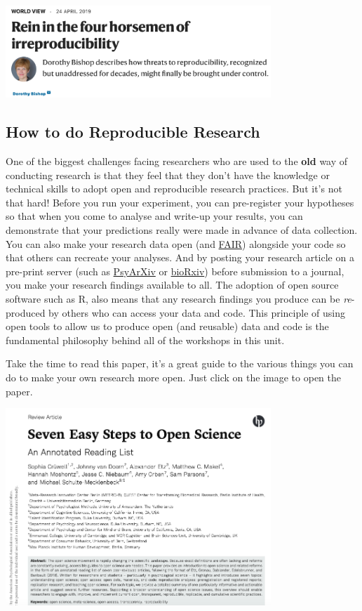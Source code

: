 \documentclass[
]{book}
\begin{document}
~~

\href{https://www.nature.com/articles/d41586-019-01307-2}{\includegraphics[width=0.75\textwidth,height=\textheight]{images/bishop.png}}

\hypertarget{how-to-do-reproducible-research}{%
\subsection{How to do Reproducible Research}\label{how-to-do-reproducible-research}}

One of the biggest challenges facing researchers who are used to the \textbf{old} way of conducting research is that they feel that they don't have the knowledge or technical skills to adopt open and reproducible research practices. But it's not that hard! Before you run your experiment, you can pre-register your hypotheses so that when you come to analyse and write-up your results, you can demonstrate that your predictions really were made in advance of data collection. You can also make your research data open (and \href{https://www.nature.com/articles/sdata201618}{FAIR}) alongside your code so that others can recreate your analyses. And by posting your research article on a pre-print server (such as \href{https://psyarxiv.com}{PsyArXiv} or \href{https://www.biorxiv.org}{bioRxiv}) before submission to a journal, you make your research findings available to all. The adoption of open source software such as R, also means that any research findings you produce can be \emph{re}-produced by others who can access your data and code. This principle of using open tools to allow us to produce open (and reusable) data and code is the fundamental philosophy behind all of the workshops in this unit.

Take the time to read this paper, it's a great guide to the various things you can do to make your own research more open. Just click on the image to open the paper.

\href{https://psycnet.apa.org/fulltext/2019-80290-002.pdf}{\includegraphics[width=0.75\textwidth,height=\textheight]{images/7_steps.png}}
\end{document}
